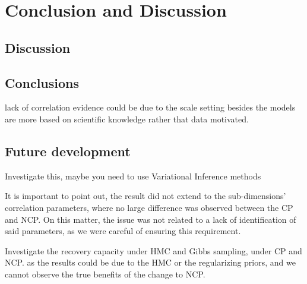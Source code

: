 \chapter{Conclusion and Discussion} \label{cap:conclusions}

\section{Discussion}

\section{Conclusions}

lack of correlation evidence could be due to the scale setting
besides the models are more based on scientific knowledge rather that data motivated.

\section{Future development}

Investigate this, maybe you need to use Variational Inference methods

It is important to point out, the result did not extend to the sub-dimensions' correlation parameters, where no large difference was observed between the CP and NCP. On this matter, the issue was not related to a lack of identification of said parameters, as we were careful of ensuring this requirement.


Investigate the recovery capacity under HMC and Gibbs sampling, under CP and NCP. as the results could be due to the HMC or the regularizing priors, and we cannot observe the true benefits of the change to NCP.
